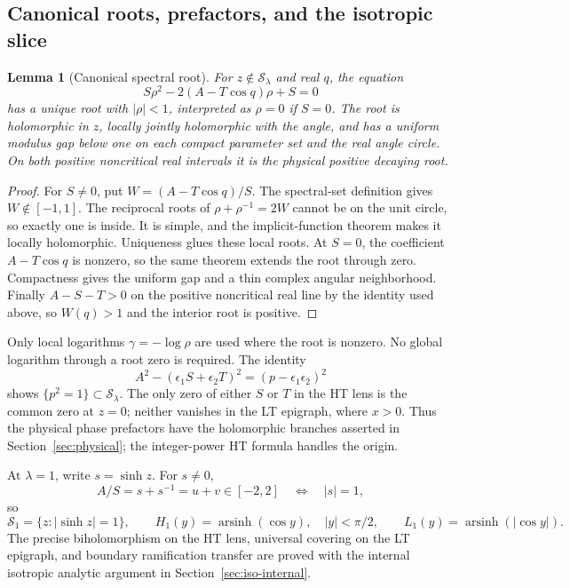 \documentclass[11pt]{article}
\numberwithin{equation}{section}
\newtheorem{lemma}[theorem]{Lemma}
\theoremstyle{definition}
\newcommand{\cS}{\mathcal S}
\begin{document}
\subsection{Canonical roots, prefactors, and the isotropic slice}

\begin{lemma}[Canonical spectral root]\label{lem:canonicalroot}
For $z\notin\cS_\lambda$ and real $q$, the equation
\[
 S\rho^2-2(A-T\cos q)\rho+S=0
\]
has a unique root with $|\rho|<1$, interpreted as $\rho=0$ if
$S=0$.  The root is holomorphic in $z$, locally jointly
holomorphic with the angle, and has a uniform modulus gap below
one on each compact parameter set and the real angle circle.
On both positive noncritical real intervals it is the physical
positive decaying root.
\end{lemma}
\begin{proof}
For $S\ne0$, put $W=(A-T\cos q)/S$.  The spectral-set definition
gives $W\notin[-1,1]$.  The reciprocal roots of
$\rho+\rho^{-1}=2W$ cannot be on the unit circle, so exactly one
is inside.  It is simple, and the implicit-function theorem makes
it locally holomorphic.  Uniqueness glues these local roots.
At $S=0$, the coefficient $A-T\cos q$ is nonzero, so the same
theorem extends the root through zero.  Compactness gives the
uniform gap and a thin complex angular neighborhood.  Finally
$A-S-T>0$ on the positive noncritical real line by the identity
used above, so $W(q)>1$ and the interior root is positive.
\end{proof}

Only local logarithms $\gamma=-\log\rho$ are used where the root
is nonzero.  No global logarithm through a root zero is required.
The identity
\[
 A^2-(\epsilon_1S+\epsilon_2T)^2=(p-\epsilon_1\epsilon_2)^2
\]
shows $\{p^2=1\}\subset\cS_\lambda$.
The only zero of either $S$ or $T$ in the HT lens is the common
zero at $z=0$; neither vanishes in the LT epigraph, where $x>0$.
Thus the physical phase prefactors have the holomorphic branches
asserted in Section~\ref{sec:physical}; the integer-power HT
formula handles the origin.

At $\lambda=1$, write $s=\sinh z$.  For $s\ne0$,
\[
 A/S=s+s^{-1}=u+v\in[-2,2]
 \quad\Longleftrightarrow\quad |s|=1,
\]
so
\begin{equation}\label{eq:isotropicgeometry}
 \cS_1=\{z:|\sinh z|=1\},\qquad
 H_1(y)=\operatorname{arsinh}(\cos y),\quad |y|<\pi/2,
 \qquad L_1(y)=\operatorname{arsinh}(|\cos y|).
\end{equation}
The precise biholomorphism on the HT lens, universal covering on the
LT epigraph, and boundary ramification transfer are proved with the
internal isotropic analytic argument in Section~\ref{sec:iso-internal}.
\end{document}
